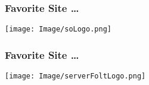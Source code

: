 \documentclass{beamer}
\begin{document}
\begin{frame}
  \frametitle{Favorite Site \ldots}
  \begin{center}
    \texttt{[image: Image/soLogo.png]}
  \end{center}
\end{frame}
\begin{frame}
  \frametitle{Favorite Site \ldots}
  \begin{center}
    \texttt{[image: Image/serverFoltLogo.png]}
  \end{center}
\end{frame}
\end{document}
